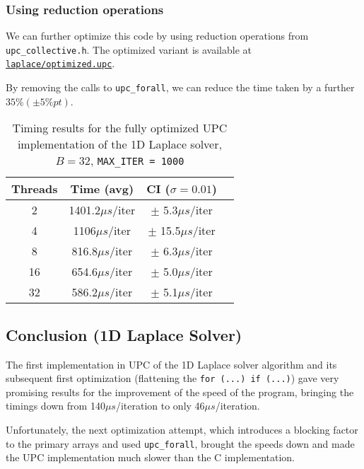 \documentclass[12pt]{article}
\newcommand{\us}[0]{${\mu}s$}
\begin{document}
\subsubsection{Using reduction operations}

We can further optimize this code by using reduction operations from \texttt{upc\_collective.h}.
The optimized variant is available at \texttt{\href{https://github.com/adri326/pc40-upc/tree/main/laplace/ex5.upc}{laplace/optimized.upc}}.

By removing the calls to \texttt{upc\_forall}, we can reduce the time taken by a further $35\% (\pm 5\%pt)$.



\begin{table}[ht]
  \centering\begin{tabular}{|c|c|c|c|}
    \hline
    Threads & Time (avg) & CI ($\sigma=0.01$) \\
    \hline
    2 & 1401.2\us/iter & $\pm$ 5.3\us/iter \\
    4 & 1106\us/iter & $\pm$ 15.5\us/iter \\
    8 & 816.8\us/iter & $\pm$ 6.3\us/iter \\
    16 & 654.6\us/iter & $\pm$ 5.0\us/iter \\
    32 & 586.2\us/iter & $\pm$ 5.1\us/iter \\
    \hline
  \end{tabular}
  \caption{Timing results for the fully optimized UPC implementation of the 1D Laplace solver, $B = 32$, \texttt{MAX\_ITER = 1000}}
  \label{tab:laplace6opt}
\end{table}

\subsection{Conclusion (1D Laplace Solver)}

The first implementation in UPC of the 1D Laplace solver algorithm and its subsequent first optimization (flattening the \texttt{for (...) if (...)}) gave very promising results for the improvement of the speed of the program, bringing the timings down from 140\us/iteration to only 46\us/iteration.

Unfortunately, the next optimization attempt, which introduces a blocking factor to the primary arrays and used \texttt{upc\_forall}, brought the speeds down and made the UPC implementation much slower than the C implementation.
\end{document}

